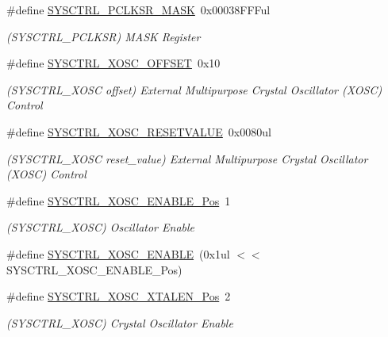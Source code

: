 \begin{DoxyCompactItemize}
\item 
\#define \mbox{\hyperlink{group___s_a_m_d21___s_y_s_c_t_r_l_gafc56d552e6f5736f4a4c533ab38ad2a4}{S\+Y\+S\+C\+T\+R\+L\+\_\+\+P\+C\+L\+K\+S\+R\+\_\+\+M\+A\+SK}}~0x00038\+F\+F\+Ful
\begin{DoxyCompactList}\small\item\em (S\+Y\+S\+C\+T\+R\+L\+\_\+\+P\+C\+L\+K\+SR) M\+A\+SK Register \end{DoxyCompactList}\item 
\#define \mbox{\hyperlink{group___s_a_m_d21___s_y_s_c_t_r_l_ga08a5463892214f35e49072d3eecb5af8}{S\+Y\+S\+C\+T\+R\+L\+\_\+\+X\+O\+S\+C\+\_\+\+O\+F\+F\+S\+ET}}~0x10
\begin{DoxyCompactList}\small\item\em (S\+Y\+S\+C\+T\+R\+L\+\_\+\+X\+O\+SC offset) External Multipurpose Crystal Oscillator (X\+O\+SC) Control \end{DoxyCompactList}\item 
\#define \mbox{\hyperlink{group___s_a_m_d21___s_y_s_c_t_r_l_ga02feedfa4eb2f72b257197da59abba0b}{S\+Y\+S\+C\+T\+R\+L\+\_\+\+X\+O\+S\+C\+\_\+\+R\+E\+S\+E\+T\+V\+A\+L\+UE}}~0x0080ul
\begin{DoxyCompactList}\small\item\em (S\+Y\+S\+C\+T\+R\+L\+\_\+\+X\+O\+SC reset\+\_\+value) External Multipurpose Crystal Oscillator (X\+O\+SC) Control \end{DoxyCompactList}\item 
\#define \mbox{\hyperlink{group___s_a_m_d21___s_y_s_c_t_r_l_ga32c4375d1adf7744be54995fc90695aa}{S\+Y\+S\+C\+T\+R\+L\+\_\+\+X\+O\+S\+C\+\_\+\+E\+N\+A\+B\+L\+E\+\_\+\+Pos}}~1
\begin{DoxyCompactList}\small\item\em (S\+Y\+S\+C\+T\+R\+L\+\_\+\+X\+O\+SC) Oscillator Enable \end{DoxyCompactList}\item 
\#define \mbox{\hyperlink{group___s_a_m_d21___s_y_s_c_t_r_l_ga919e6081551bde025dd64a7b9bca4b66}{S\+Y\+S\+C\+T\+R\+L\+\_\+\+X\+O\+S\+C\+\_\+\+E\+N\+A\+B\+LE}}~(0x1ul $<$$<$ S\+Y\+S\+C\+T\+R\+L\+\_\+\+X\+O\+S\+C\+\_\+\+E\+N\+A\+B\+L\+E\+\_\+\+Pos)
\item 
\#define \mbox{\hyperlink{group___s_a_m_d21___s_y_s_c_t_r_l_ga81b5277cb7f3bcad8392cdcc1e86e865}{S\+Y\+S\+C\+T\+R\+L\+\_\+\+X\+O\+S\+C\+\_\+\+X\+T\+A\+L\+E\+N\+\_\+\+Pos}}~2
\begin{DoxyCompactList}\small\item\em (S\+Y\+S\+C\+T\+R\+L\+\_\+\+X\+O\+SC) Crystal Oscillator Enable \end{DoxyCompactList}\item 
$$
\end{DoxyCompactItemize}
